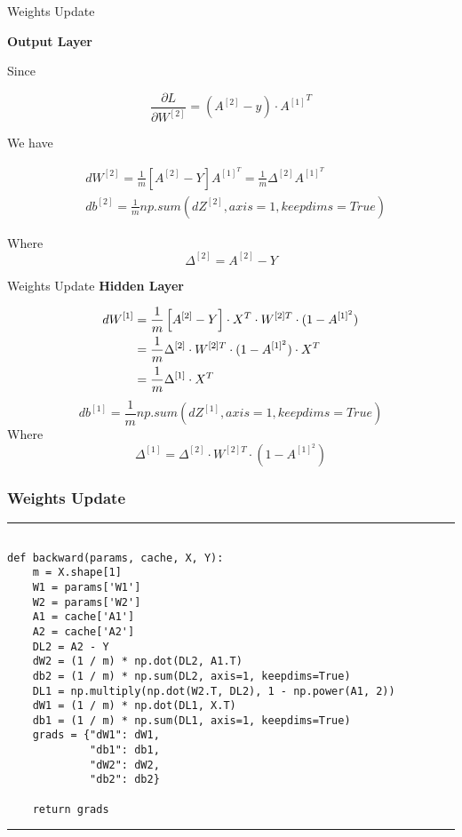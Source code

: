 \documentclass[11pt]{beamer}
\begin{document}
\begin{frame}{Weights Update}

\textbf{Output Layer}

Since

\begin{equation}
\frac{\partial L}{\partial W^{[2]}} = (A^{[2]} - y) \cdot {A^{[1]}}^T
\end{equation}

We have

\begin{align}
& dW^{[2]} = \frac{1}{m}\left[A^{[2]} - Y \right]A^{[1]^T} = \frac{1}{m}\Delta^{[2]}A^{[1]^T} \\
& db^{[2]} = \frac{1}{m}np.sum(dZ^{[2]}, axis=1, keepdims=True) 
\end{align}

Where
\begin{equation} 
\Delta^{[2]} = A^{[2]} - Y  
\end{equation}
\end{frame}
\begin{frame}{Weights Update}
\textbf{Hidden Layer}

\begin{align}
dW^{[1]} &= \frac{1}{m} \left[ A^{[2]} - Y \right] \cdot  X^{T} \cdot W^{[2]T} \cdot (1 - A^{[1]^2}) \notag\\
         &= \frac{1}{m} \Delta^{[2]} \cdot W^{[2]T} \cdot (1 - A^{[1]^2}) \cdot  X^{T}   \notag\\
         &= \frac{1}{m} \Delta^{[1]} \cdot  X^{T} 
\end{align}
\begin{equation} 
db^{[1]} = \frac{1}{m}np.sum(dZ^{[1]}, axis=1, keepdims=True)  
\end{equation}
Where
$$\Delta^{[1]} = \Delta^{[2]} \cdot W^{[2]T} \cdot (1 - A^{[1]^2})$$
\end{frame}
\begin{frame}[fragile]
\frametitle{Weights Update}
\rule{\textwidth}{1pt}
\scriptsize
\begin{verbatim}

def backward(params, cache, X, Y):
    m = X.shape[1]
    W1 = params['W1']
    W2 = params['W2']
    A1 = cache['A1']
    A2 = cache['A2']
    DL2 = A2 - Y
    dW2 = (1 / m) * np.dot(DL2, A1.T)
    db2 = (1 / m) * np.sum(DL2, axis=1, keepdims=True)
    DL1 = np.multiply(np.dot(W2.T, DL2), 1 - np.power(A1, 2))
    dW1 = (1 / m) * np.dot(DL1, X.T)
    db1 = (1 / m) * np.sum(DL1, axis=1, keepdims=True)
    grads = {"dW1": dW1,
             "db1": db1,
             "dW2": dW2,
             "db2": db2}

    return grads
\end{verbatim}
\rule{\textwidth}{1pt}
\end{frame}
\end{document}
